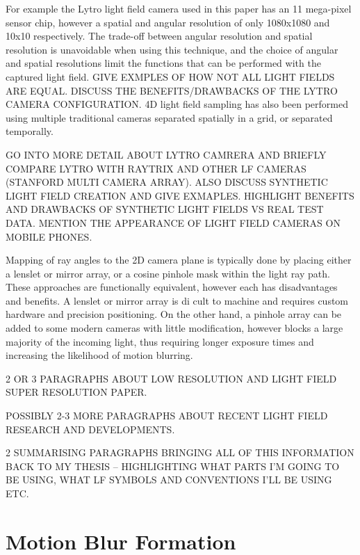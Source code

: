 For example the Lytro light field camera used in this paper has an 11 mega-pixel sensor chip, however a spatial and angular resolution of only 1080x1080 and 10x10 respectively. The trade-off between angular resolution and spatial resolution is unavoidable when using this technique, and the choice of angular and spatial resolutions limit the functions that can be performed with the captured light field. GIVE EXMPLES OF HOW NOT ALL LIGHT FIELDS ARE EQUAL. DISCUSS THE BENEFITS/DRAWBACKS OF THE LYTRO CAMERA CONFIGURATION. 4D light field sampling has also been performed using multiple traditional cameras separated spatially in a grid, or separated temporally.

GO INTO MORE DETAIL ABOUT LYTRO CAMRERA AND BRIEFLY COMPARE LYTRO WITH RAYTRIX AND OTHER LF CAMERAS (STANFORD MULTI CAMERA ARRAY). ALSO DISCUSS SYNTHETIC LIGHT FIELD CREATION AND GIVE EXMAPLES. HIGHLIGHT BENEFITS AND DRAWBACKS OF SYNTHETIC LIGHT FIELDS VS REAL TEST DATA. MENTION THE APPEARANCE OF LIGHT FIELD CAMERAS ON MOBILE PHONES.

Mapping of ray angles to the 2D camera plane is typically done by placing either a lenslet or mirror array, or a cosine pinhole mask within the light ray path. These approaches are functionally equivalent, however each has disadvantages and benefits. A lenslet or mirror array is di cult to machine and requires custom hardware and precision positioning. On the other hand, a pinhole array can be added to some modern cameras with little modification, however blocks a large majority of the incoming light, thus requiring longer exposure times and increasing the likelihood of motion blurring.

2 OR 3 PARAGRAPHS ABOUT LOW RESOLUTION AND LIGHT FIELD SUPER RESOLUTION PAPER.

POSSIBLY 2-3 MORE PARAGRAPHS ABOUT RECENT LIGHT FIELD RESEARCH AND DEVELOPMENTS.

2 SUMMARISING PARAGRAPHS BRINGING ALL OF THIS INFORMATION BACK TO MY THESIS – HIGHLIGHTING WHAT PARTS I’M GOING TO BE USING, WHAT LF SYMBOLS AND CONVENTIONS I’LL BE USING ETC.



\section{Motion Blur Formation}


